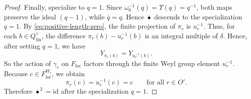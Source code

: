 \documentclass{amsart}
\theoremstyle{definition}
\numberwithin{equation}{section}
\begin{document}
\begin{proof}
Finally, specialize to $q=1$. Since
\(\omega_0^{-1}(q)=\Upsilon(q)=q^{-1}\), both maps preserve the ideal
\((q-1)\), while \(\overline q=q\). Hence \(\overline{\bullet}\) descends to
the specialization \(q=1\). By
\eqref{eq:positive-length-zero}, the finite projection of \(\pi_r\) is
\(u_r^{-1}\). Thus, for each \(b\in Q_{\mathrm{fin}}^\vee\), the difference
\(\pi_r(b)-u_r^{-1}(b)\) is an integral multiple of \(\delta\). Hence, after setting
$q=1$, we have
\[
Y_{\pi_r(b)}=Y_{u_r^{-1}(b)}.
\]
So the action of $\gamma_r$ on $F_{\mathrm{loc}}$ factors through the finite Weyl group element $u_r^{-1}$. Because $c\in F_{\mathrm{loc}}^{W_{\mathrm f}}$, we obtain
\[
\pi_r(c)=u_r^{-1}(c)=c
\qquad\text{for all }r\in O'.
\]
Therefore $\overline{\bullet}^{\,2}=\mathrm{id}$ after the specialization $q=1$.
\end{proof}
\end{document}
